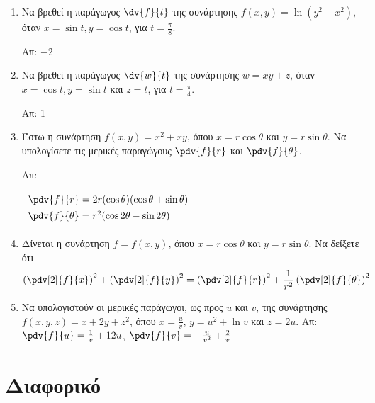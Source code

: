 \begin{enumerate}

  \item Να βρεθεί η παράγωγος $\dv{f}{t}$ της συνάρτησης 
    $f(x,y)=\ln(y^2-x^2)$, όταν $x=\sin t, y=\cos t$, για $t=\frac{\pi}{8}$.

    \hfill Απ: $-2$

  \item Να βρεθεί η παράγωγος $\dv{w}{t}$ της συνάρτησης 
    $ w = xy+z $, όταν $ x = \cos{t}, y = \sin{t}$ και $ z = t $, για 
    $ t = \frac{ \pi }{ 4 } $.

    \hfill Απ: 1

  \item Έστω η συνάρτηση  $ f(x,y) = x^{2} + xy $, όπου $ x=r \cos{\theta} $ και 
    $ y= r \sin{\theta} $. 
    Να υπολογίσετε τις μερικές παραγώγους $ \pdv{f}{r} $ και $ \pdv{f}{\theta} $.  

    \hfill Απ: \begin{tabular}{l}
      $ \pdv{f}{r} = 2r(\cos{\theta} )(\cos{\theta} + \sin{\theta}) $ \\[10pt]
      $ \pdv{f}{\theta}=r^{2}(\cos{2\theta} - \sin{2 \theta}) $
    \end{tabular}

  \item Δίνεται η συνάρτηση $ f = f(x,y) $, όπου $ x=r \cos{\theta} $ και 
    $ y= r \sin{\theta} $. Να δείξετε ότι 
    \[
      \left(\pdv[2]{f}{x}\right)^{2} + \left(\pdv[2]{f}{y}\right)^{2} = 
      \left(\pdv[2]{f}{r}\right)^{2} + \frac{1}{r^{2}} 
      \left(\pdv[2]{f}{\theta}\right)^{2}
    \] 

  \item Να υπολογιστούν οι μερικές παράγωγοι, ως προς $u$ και $v$, 
    της συνάρτησης $ f(x,y,z) = x + 2y + z^{2}$, όπου $ x = \frac{ u }{ v } $, 
    $y = u^{2} + \ln{v} $ και $ z = 2u $.
    \hfill Απ: $ \pdv{f}{u} = \frac{1}{ v } + 12u $, 
    $\pdv{f}{v} = -\frac{ u }{ v^{2} } + \frac{ 2 }{ v } $

\end{enumerate}

\section*{Διαφορικό}

